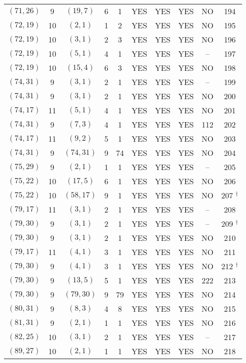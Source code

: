 \begin{longtable}{|c|c|c|c|c|c|c|c|c|c|}
$(71, 26)$ & 9 & $(19, 7)$ & 6 & 1 & YES & YES & YES & NO & 194\\
$(72, 19)$ & 10 & $(2, 1)$ & 1 & 2 & YES & YES & YES & NO & 195\\
$(72, 19)$ & 10 & $(3, 1)$ & 2 & 3 & YES & YES & YES & NO & 196\\
$(72, 19)$ & 10 & $(5, 1)$ & 4 & 1 & YES & YES & YES & -- & 197\\
$(72, 19)$ & 10 & $(15, 4)$ & 6 & 3 & YES & YES & YES & NO & 198\\
$(74, 31)$ & 9 & $(3, 1)$ & 2 & 1 & YES & YES & YES & -- & 199\\
$(74, 31)$ & 9 & $(3, 1)$ & 2 & 1 & YES & YES & YES & NO & 200\\
$(74, 17)$ & 11 & $(5, 1)$ & 4 & 1 & YES & YES & YES & NO & 201\\
$(74, 31)$ & 9 & $(7, 3)$ & 4 & 1 & YES & YES & YES & 112 & 202\\
$(74, 17)$ & 11 & $(9, 2)$ & 5 & 1 & YES & YES & YES & NO & 203\\
$(74, 31)$ & 9 & $(74, 31)$ & 9 & 74 & YES & YES & YES & NO & 204\\
$(75, 29)$ & 9 & $(2, 1)$ & 1 & 1 & YES & YES & YES & -- & 205\\
$(75, 22)$ & 10 & $(17, 5)$ & 6 & 1 & YES & YES & YES & NO & 206\\
$(75, 22)$ & 10 & $(58, 17)$ & 9 & 1 & YES & YES & YES & NO & 207 ${}^\dagger$\\
$(79, 17)$ & 11 & $(3, 1)$ & 2 & 1 & YES & YES & YES & -- & 208\\
$(79, 30)$ & 9 & $(3, 1)$ & 2 & 1 & YES & YES & YES & -- & 209 ${}^\dagger$\\
$(79, 30)$ & 9 & $(3, 1)$ & 2 & 1 & YES & YES & YES & NO & 210\\
$(79, 17)$ & 11 & $(4, 1)$ & 3 & 1 & YES & YES & YES & NO & 211\\
$(79, 30)$ & 9 & $(4, 1)$ & 3 & 1 & YES & YES & YES & NO & 212 ${}^\dagger$\\
$(79, 30)$ & 9 & $(13, 5)$ & 5 & 1 & YES & YES & YES & 222 & 213\\
$(79, 30)$ & 9 & $(79, 30)$ & 9 & 79 & YES & YES & YES & NO & 214\\
$(80, 31)$ & 9 & $(8, 3)$ & 4 & 8 & YES & YES & YES & NO & 215\\
$(81, 31)$ & 9 & $(2, 1)$ & 1 & 1 & YES & YES & YES & NO & 216\\
$(82, 25)$ & 10 & $(3, 1)$ & 2 & 1 & YES & YES & YES & -- & 217\\
$(89, 27)$ & 10 & $(2, 1)$ & 1 & 1 & YES & YES & YES & NO & 218\\

\end{longtable}
